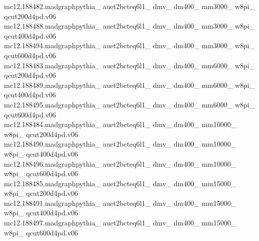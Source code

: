 mc12.188482.madgraphpythia\_ auet2bcteq6l1\_ dmv\_ dm400\_ mm3000\_ w8pi\_ qcut200d4pd.v06\\
mc12.188488.madgraphpythia\_ auet2bcteq6l1\_ dmv\_ dm400\_ mm3000\_ w8pi\_ qcut400d4pd.v06\\
mc12.188494.madgraphpythia\_ auet2bcteq6l1\_ dmv\_ dm400\_ mm3000\_ w8pi\_ qcut600d4pd.v06\\

mc12.188483.madgraphpythia\_ auet2bcteq6l1\_ dmv\_ dm400\_ mm6000\_ w8pi\_ qcut200d4pd.v06\\
mc12.188489.madgraphpythia\_ auet2bcteq6l1\_ dmv\_ dm400\_ mm6000\_ w8pi\_ qcut400d4pd.v06\\
mc12.188495.madgraphpythia\_ auet2bcteq6l1\_ dmv\_ dm400\_ mm6000\_ w8pi\_ qcut600d4pd.v06\\

mc12.188484.madgraphpythia\_ auet2bcteq6l1\_ dmv\_ dm400\_ mm10000\_ w8pi\_ qcut200d4pd.v06\\

mc12.188490.madgraphpythia\_ auet2bcteq6l1\_ dmv\_ dm400\_ mm10000\_ w8pi\_ qcut400d4pd.v06\\

mc12.188496.madgraphpythia\_ auet2bcteq6l1\_ dmv\_ dm400\_ mm10000\_ w8pi\_ qcut600d4pd.v06\\


mc12.188485.madgraphpythia\_ auet2bcteq6l1\_ dmv\_ dm400\_ mm15000\_ w8pi\_ qcut200d4pd.v06\\

mc12.188491.madgraphpythia\_ auet2bcteq6l1\_ dmv\_ dm400\_ mm15000\_ w8pi\_ qcut400d4pd.v06\\

mc12.188497.madgraphpythia\_ auet2bcteq6l1\_ dmv\_ dm400\_ mm15000\_ w8pi\_ qcut600d4pd.v06\\
